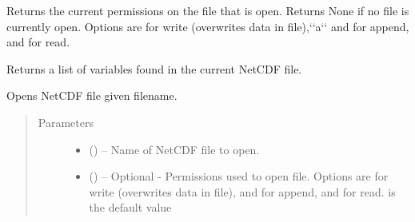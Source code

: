 \documentclass[a4paper,10pt,openany,english]{sphinxmanual}
\begin{document}
\begin{fulllineitems}
\begin{fulllineitems}
\begin{quote}
\begin{description}
\end{description}\end{quote}

\end{fulllineitems}


\begin{fulllineitems}
\label{egadsapi:egads.input.netcdf_io.NetCdf.get_perms}
Returns the current permissions on the file that is open. Returns None if
no file is currently open. Options are  for write (overwrites
data in file),{}`{}`a{}`{}` and  for append, and  for read.

\end{fulllineitems}


\begin{fulllineitems}
\label{egadsapi:egads.input.netcdf_io.NetCdf.get_variable_list}
Returns a list of variables found in the current NetCDF file.

\end{fulllineitems}


\begin{fulllineitems}
\label{egadsapi:egads.input.netcdf_io.NetCdf.open}
Opens NetCDF file given filename.
\begin{quote}\begin{description}
\item[{Parameters}] \leavevmode\begin{itemize}
\item {} 
 () -- Name of NetCDF file to open.

\item {} 
 () -- Optional - Permissions used to open file. Options are  for write 
(overwrites data in file),  and  for append, and  for 
read.  is the default value

\end{itemize}


\end{description}
\end{quote}
\end{fulllineitems}
\end{fulllineitems}
\end{document}
